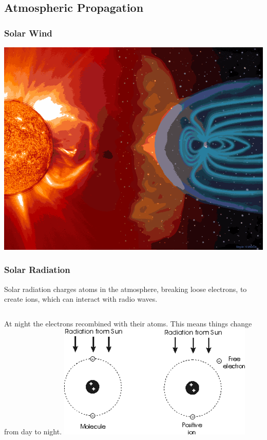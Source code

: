 \documentclass[10pt, handout]{beamer}
\begin{document}
\subsection{Atmospheric Propagation}

\begin{frame}
\frametitle{Solar Wind}
\begin{center}
\includegraphics[width=\textwidth]{magfield.png}
\end{center}
\end{frame}

\begin{frame}
\frametitle{Solar Radiation}
Solar radiation charges atoms in the atmosphere, breaking loose electrons, to create ions, which can interact with radio waves.\\
\begin{columns}
At night the electrons recombined with their atoms. This means things change from day to night.
\includegraphics[width=\textwidth]{ions.png}
\end{columns}
\end{frame}
\end{document}
